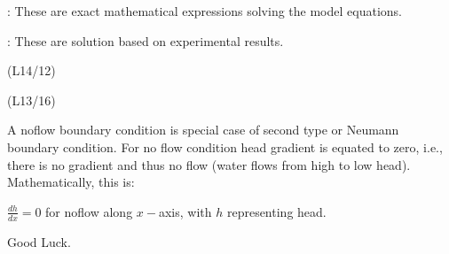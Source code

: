 \documentclass[letterpaper,10pt,english]{jupyterBook}
\begin{document}
\sphinxAtStartPar
{} : These are exact mathematical expressions solving the model equations.

\sphinxAtStartPar
{} : These are solution based on experimental results.

\sphinxAtStartPar
{} \sphinxhyphen{} (L14/12)



\sphinxAtStartPar
{}
(L13/16)

\sphinxAtStartPar
A no\sphinxhyphen{}flow boundary condition is special case of second type or Neumann boundary condition. For no flow condition head gradient is equated to zero, i.e., there is no gradient and thus no flow (water flows from high to low head). Mathematically, this is:

\sphinxAtStartPar
\(\frac{dh}{dx} = 0 \) for no\sphinxhyphen{}flow along \(x-\)axis, with \(h\) representing head.

\sphinxAtStartPar
Good Luck.







\renewcommand{\indexname}{Index}
\printindex
\end{document}

